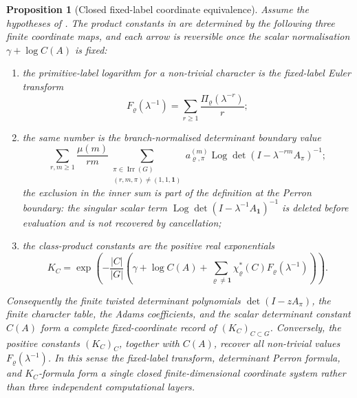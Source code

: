 \documentclass[11pt,a4paper]{amsart}
\theoremstyle{plain}
\newtheorem{proposition}[theorem]{Proposition}
\theoremstyle{definition}
\theoremstyle{remark}
\DeclareMathOperator{\Irr}{Irr}
\DeclareMathOperator{\Log}{Log}
\begin{document}
\begin{proposition}[Closed fixed-label coordinate equivalence]
  \label{prop:main-iii-fixed-label-coordinate-factorisation}
  Assume the hypotheses of .  The product
  constants in  are determined by the
  following three finite coordinate maps, and each arrow is reversible once the scalar
  normalisation \(\gamma+\log C(A)\) is fixed:
  \begin{enumerate}[label=\textup{(\roman*)},leftmargin=*]
    \item the primitive-label logarithm for a non-trivial character is the
      fixed-label Euler transform
      \[
        F_\varrho(\lambda^{-1})
        =\sum_{r\ge1}\frac{\Pi_\varrho(\lambda^{-r})}{r};
      \]
    \item the same number is the branch-normalised determinant boundary value
      \[
        \sum_{r,m\ge1}\frac{\mu(m)}{rm}
        \sum_{\substack{\pi\in\Irr(G)\\(r,m,\pi)\ne(1,1,\mathbf1)}}
          a_{\varrho,\pi}^{(m)}
          \Log\det(I-\lambda^{-rm}A_\pi)^{-1};
      \]
      the exclusion in the inner sum is part of the definition at the Perron
      boundary: the singular scalar term
      \(\Log\det(I-\lambda^{-1}A_{\mathbf1})^{-1}\) is deleted before
      evaluation and is not recovered by cancellation;
    \item the class-product constants are the positive real exponentials
      \[
        K_C=
        \exp\!\left(
        -\frac{|C|}{|G|}
        \left(
          \gamma+\log C(A)+
          \sum_{\varrho\ne\mathbf1}\chi_\varrho^\ast(C)
            F_\varrho(\lambda^{-1})
        \right)
        \right).
      \]
  \end{enumerate}
  Consequently the finite twisted determinant polynomials
  \(\det(I-zA_\pi)\), the finite character table, the Adams coefficients, and
  the scalar determinant constant \(C(A)\) form a complete fixed-coordinate
  record of \((K_C)_{C\subset G}\).  Conversely, the positive constants
  \((K_C)_C\), together with \(C(A)\), recover all non-trivial values
  \(F_\varrho(\lambda^{-1})\).  In this sense the fixed-label transform,
  determinant Perron formula, and \(K_C\)-formula form a single closed
  finite-dimensional coordinate system rather than three independent
  computational layers.
\end{proposition}
\end{document}
